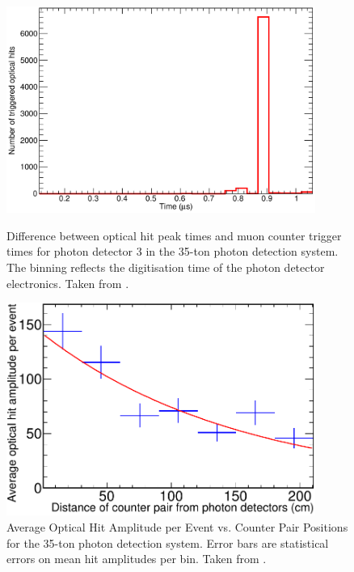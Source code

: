 \begin{figure}

  \begin{minipage}[t]{0.48\linewidth}
    \centering
    \includegraphics[width=0.9\textwidth]{35tonPhotonDetectorsResolution.pdf}
    \caption[Difference between optical hit peak times and muon counter trigger times for photon detector 3 in the 35-ton photon detection system.]{Difference between optical hit peak times and muon counter trigger times for photon detector 3 in the 35-ton photon detection system. The binning reflects the digitisation time of the photon detector electronics.  Taken from \cite{35tonPhotonDetectors}.}
    \label{fig:35tonPhotonDetectorsResolution}
  \end{minipage}
  \hfill
  \begin{minipage}[t]{0.48\linewidth}
    \centering
    \includegraphics[width=0.9\textwidth]{35tonPhotonDetectorsAttenuation.pdf}
    \caption[Average Optical Hit Amplitude per Event vs. Counter Pair Positions for the 35-ton photon detection system.]{Average Optical Hit Amplitude per Event vs. Counter Pair Positions for the 35-ton photon detection system.  Error bars are statistical errors on mean hit amplitudes per bin.  Taken from \cite{35tonPhotonDetectors}.}
    \label{fig:35tonPhotonDetectorsAttenuation}
  \end{minipage}

\end{figure}


